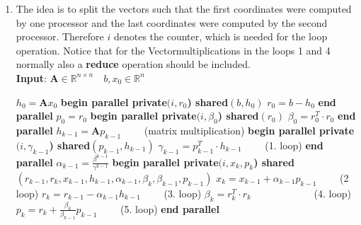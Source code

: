 \documentclass{article}
\begin{document}
\begin{enumerate}[label=(\alph*)]
\item
  The idea is to split the vectors such that the first coordinates were computed by one processor and the last coordinates were computed by the second processor. Therefore $i$ denotes the counter, which is needed for the loop operation. Notice that for the Vectormultiplications in the loops 1 and 4 normally also a \textbf{reduce} operation should be included.
  \\
   \textbf{Input}: $ \textbf{A} \in \mathbb{R}^{n\times n} \quad b, x_0\in \mathbb{R}^n$
    \begin{algorithmic}[1]
	\State $h_{0} = \textbf{A}x_{0}$ 
	\State \textbf{begin parallel private$(i, r_{0}$) shared$(b, h_{0})$}
	\State $r_0 = b - h_0$
	\State \textbf{end parallel}
	\State $p_0 = r_0$
	\State \textbf{begin parallel private$(i, \beta_{0}$) shared$(r_0)$}
	\State $\beta_0 = r_0^T\cdot r_0$
	\State \textbf{end parallel}
	\State $h_{k-1} = \textbf{A}p_{k-1}\qquad$ (matrix multiplication)
	\State \textbf{begin parallel private$(i, \gamma_{k-1}$) shared$(p_{k-1}, h_{k-1})$}
	\State $\gamma_{k-1} = p^{T}_{k-1}\cdot h_{k-1}\qquad$ (1. loop)
	\State \textbf{end parallel}
	\State $\alpha_{k-1} = \frac{\beta^{k-1}}{\gamma^{k-1}}$
	\State \textbf{begin parallel private$(i,x_k, p_k$) shared$(r_{k-1}, r_k,x_{k-1}, h_{k-1},\alpha_{k-1},\beta_k, \beta_{k-1}, p_{k-1})$}
	\State $x_k = x_{k-1} + \alpha_{k-1}p_{k-1}\qquad$ (2 loop)
	\State $r_k = r_{k-1} - \alpha_{k-1}h_{k-1}\qquad$ (3. loop)
	\State $\beta_k = r_k^T\cdot r_k\qquad \qquad \qquad$ (4. loop)
	\State $p_k = r_{k} + \frac{\beta_k}{\beta_{k-1}}p_{k-1}\qquad$ (5. loop)
	\State \textbf{end parallel}
	\EndFor
    \end{algorithmic}



\end{enumerate}
\end{document}
